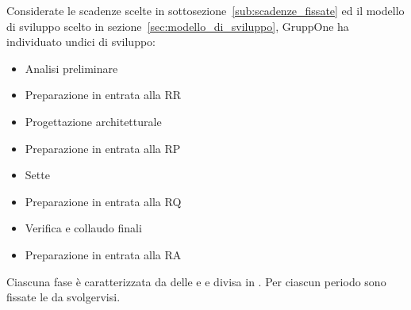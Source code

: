 \documentclass[../piano-di-progetto.tex]{subfiles}
\begin{document}
Considerate le scadenze scelte in sottosezione~\ref{sub:scadenze_fissate} ed il modello di sviluppo scelto in sezione~\ref{sec:modello_di_sviluppo}, GruppOne ha individuato undici  di sviluppo:
\begin{itemize}
  \item Analisi preliminare
  \item Preparazione in entrata alla RR
  \item Progettazione architetturale
  \item Preparazione in entrata alla RP
  \item Sette 
  \item Preparazione in entrata alla RQ
  \item Verifica e collaudo finali
  \item Preparazione in entrata alla RA
\end{itemize}
Ciascuna fase è caratterizzata da delle  e  e divisa in .
Per ciascun periodo sono fissate le  da svolgervisi.
\end{document}
